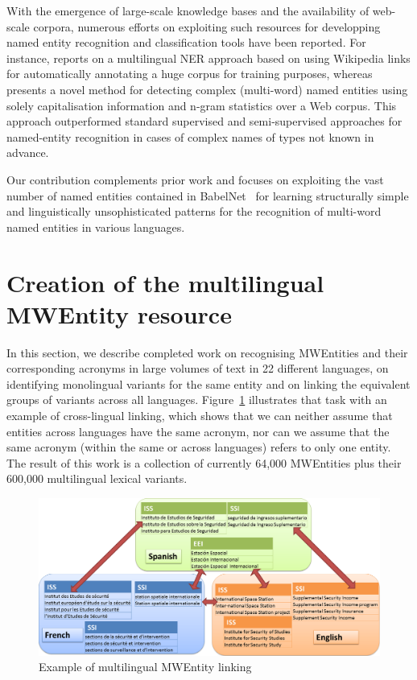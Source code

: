 \documentclass[output=paper]{langsci/langscibook}
\begin{document}
With the emergence of large-scale knowledge bases and the availability
of web-scale corpora, numerous efforts on exploiting such resources
for developping named entity recognition and classification tools have
been reported. For instance, \citet{nothman:2013:lmn} reports on a
multilingual NER approach based on using Wikipedia links for
automatically annotating a huge corpus for training purposes, whereas
\citet{downey:2007:lcn} presents a novel method for detecting
complex (multi-word) named entities using solely capitalisation
information and n-gram statistics over a Web corpus. This approach
outperformed standard supervised and semi-supervised
approaches for named-entity recognition in cases of complex names of
types not known in advance.

Our contribution complements prior work and focuses on exploiting the
vast number of named entities contained in BabelNet~\citep{navigli-12}
for learning structurally simple and linguistically unsophisticated
patterns for the recognition of multi-word named entities in various
languages.
 
\section{Creation of the multilingual MWEntity resource}
\label{jac:chap10sec3}
In this section, we describe completed work \citep{jacquet-16} on recognising MWEntities and their corresponding acronyms in large volumes of text in 22 different languages, on identifying monolingual variants for the same entity and on linking the equivalent groups of variants across all languages. Figure~\ref{jac:acronym linking} illustrates that task with an example of cross-lingual linking, which shows that we can neither assume that entities across languages have the same acronym, nor can we assume that the same acronym (within the same or across languages) refers to only one entity.
The result of this work is a collection of currently 64,000 MWEntities plus their 600,000 multilingual lexical variants.

\begin{figure}
\includegraphics[scale=0.32]{figures/multiLingAcroLinking.png}
\caption{Example of multilingual MWEntity linking}
\label{jac:acronym linking}
\end{figure}
\end{document}
